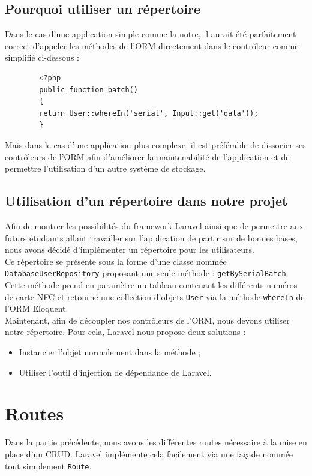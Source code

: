 	\subsection{Pourquoi utiliser un répertoire}
		Dans le cas d'une application simple comme la notre, il aurait été parfaitement correct d'appeler les méthodes de l'ORM directement dans le contrôleur comme simplifié ci-dessous :
		\begin{verbatim}
		<?php
		public function batch()
		{
		return User::whereIn('serial', Input::get('data'));
		}
		\end{verbatim}

		Mais dans le cas d'une application plus complexe, il est préférable de dissocier ses contrôleurs de l'ORM afin d'améliorer la maintenabilité de l'application et de permettre l'utilisation d'un autre système de stockage.

	\subsection{Utilisation d'un répertoire dans notre projet}
		Afin de montrer les possibilités du framework Laravel ainsi que de permettre aux futurs étudiants allant travailler sur l'application de partir sur de bonnes bases, nous avons décidé d'implémenter un répertoire pour les utilisateurs.\\

		Ce répertoire se présente sous la forme d'une classe nommée \verb|DatabaseUserRepository| proposant une seule méthode : \verb|getBySerialBatch|. Cette méthode prend en paramètre un tableau contenant les différents numéros de carte NFC et retourne une collection d'objets \verb|User| via la méthode \verb|whereIn| de l'ORM Eloquent.\\

		Maintenant, afin de découpler nos contrôleurs de l'ORM, nous devons utiliser notre répertoire. Pour cela, Laravel nous propose deux solutions :
		\begin{itemize}
			\item Instancier l'objet normalement dans la méthode ;
			\item Utiliser l'outil d'injection de dépendance de Laravel.
		\end{itemize}

\section{Routes}
	Dans la partie précédente, nous avons les différentes routes nécessaire à la mise en place d'un CRUD. Laravel implémente cela facilement via une façade nommée tout simplement \verb|Route|.

